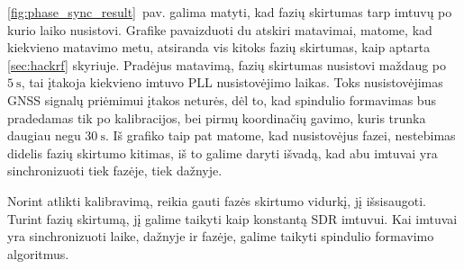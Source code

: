 \documentclass[main.tex]{subfiles}
\begin{document}
\ref{fig:phase_sync_result}~pav. galima matyti, kad fazių skirtumas tarp
imtuvų po kurio laiko nusistovi. Grafike pavaizduoti du atskiri matavimai,
matome, kad kiekvieno matavimo metu, atsiranda vis kitoks fazių skirtumas,
kaip aptarta \ref{sec:hackrf} skyriuje.
Pradėjus matavimą, fazių skirtumas nusistovi maždaug po $5\ \mathrm{s}$, tai
įtakoja kiekvieno imtuvo PLL nusistovėjimo laikas. Toks nusistovėjimas
GNSS signalų priėmimui įtakos neturės, dėl to, kad spindulio formavimas
bus pradedamas tik po kalibracijos, bei pirmų koordinačių gavimo,
kuris trunka daugiau negu $30\ \mathrm{s}$.
Iš grafiko taip pat matome, kad nusistovėjus fazei, nestebimas didelis fazių skirtumo
kitimas, iš to galime daryti išvadą, kad abu imtuvai yra sinchronizuoti tiek fazėje,
tiek dažnyje.

Norint atlikti kalibravimą, reikia gauti fazės skirtumo vidurkį, jį išsisaugoti.
Turint fazių skirtumą, jį galime taikyti kaip konstantą SDR imtuvui. Kai imtuvai
yra sinchronizuoti laike, dažnyje ir fazėje, galime taikyti spindulio formavimo
algoritmus.
\end{document}
